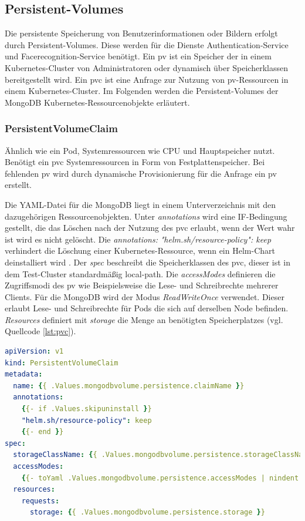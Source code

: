 \subsection{Persistent-Volumes}

Die persistente Speicherung von Benutzerinformationen oder Bildern erfolgt durch Persistent-Volumes.
Diese werden für die Dienste Authentication-Service und Facerecognition-Service benötigt.
Ein \ac{pv} ist ein Speicher der in einem Kubernetes-Cluster von Administratoren oder dynamisch über Speicherklassen bereitgestellt wird.
Ein \ac{pvc} ist eine Anfrage zur Nutzung von \acs{pv}-Ressourcen in einem Kubernetes-Cluster.
Im Folgenden werden die Persistent-Volumes der MongoDB Kubernetes-Ressourcenobjekte erläutert.


\subsubsection{PersistentVolumeClaim}

Ähnlich wie ein Pod, Systemressourcen wie CPU und Hauptspeicher nutzt.
Benötigt ein \acs{pvc} Systemressourcen in Form von Festplattenspeicher.
Bei fehlenden \acs{pv} wird durch dynamische Provisionierung für die Anfrage ein \acs{pv} erstellt.

Die YAML-Datei für die MongoDB liegt in einem Unterverzeichnis mit den dazugehörigen Ressourcenobjekten.
Unter \textit{annotations} wird eine IF-Bedingung gestellt, die das Löschen nach der Nutzung des \acs{pvc} erlaubt, wenn der Wert wahr ist wird es nicht gelöscht.
Die \textit{annotations: }\textit{"helm.sh/resource-policy": keep} verhindert die Löschung einer Kubernetes-Ressource, wenn ein Helm-Chart deinstalliert wird \cite{helmtipsandtricks}.
Der \textit{spec} beschreibt die Speicherklassen des \acs{pvc}, dieser ist in dem Test-Cluster standardmäßig local-path.
Die \textit{accessModes} definieren die Zugriffsmodi des \acs{pv} wie Beispielsweise die Lese- und Schreibrechte mehrerer Clients.
Für die MongoDB wird der Modus \textit{ReadWriteOnce} verwendet.
Dieser erlaubt Lese- und Schreibrechte für Pods die sich auf derselben Node befinden.
\textit{Resources} definiert mit \textit{storage} die Menge an benötigten Speicherplatzes (vgl. Quellcode \ref{lst:pvc}).

\begin{lstlisting}[caption={pvc-claim.yaml },captionpos=b,label={lst:pvc},language=yaml]
apiVersion: v1
kind: PersistentVolumeClaim
metadata:
  name: {{ .Values.mongodbvolume.persistence.claimName }}
  annotations:
    {{- if .Values.skipuninstall }}
    "helm.sh/resource-policy": keep
    {{- end }}
spec:
  storageClassName: {{ .Values.mongodbvolume.persistence.storageClassName }}
  accessModes:
    {{- toYaml .Values.mongodbvolume.persistence.accessModes | nindent 4  }}
  resources:
    requests:
      storage: {{ .Values.mongodbvolume.persistence.storage }}
\end{lstlisting}


